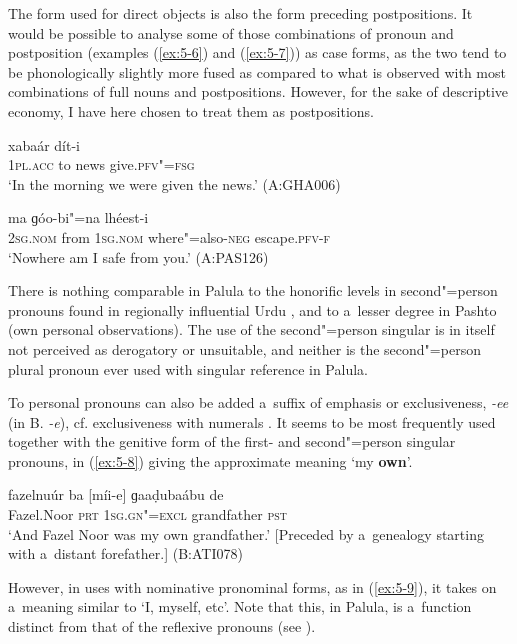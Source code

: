 The form used for direct objects is also the form preceding postpositions. It would be possible to analyse some of those combinations of pronoun and postposition (examples (\ref{ex:5-6}) and (\ref{ex:5-7})) as case forms, as the two tend to be phonologically slightly more fused as compared to what is observed with most combinations of full nouns and postpositions. However, for the sake of descriptive economy, I have here chosen to treat them as postpositions. 

\begin{exe}
\ex
\label{ex:5-6}
 xabaár dít-i \\
	1\textsc{pl}.\textsc{acc} to news give.\textsc{pfv"=fsg} \\
\glt `In the morning we were given the news.' (A:GHA006)

\ex
\label{ex:5-7}
\gll [tu díi] ma ɡóo-bi"=na lhéest-i \\
\textsc{2sg.nom} from \textsc{1sg.nom} where"=also-\textsc{neg} escape.\textsc{pfv-f} \\
\glt `Nowhere am I safe from you.' (A:PAS126)
\end{exe}

There is nothing comparable in Palula to the honorific levels in second"=person pronouns found in regionally influential Urdu \citep[17]{schmidt2004}, and to a~lesser degree in Pashto (own personal observations). The use of the second"=person singular is in itself not perceived as derogatory or unsuitable, and neither is the second"=person plural pronoun ever used with singular reference in Palula.

To personal pronouns can also be added a~suffix of emphasis or exclusiveness, \textit{-ee} (in B. \textit{-e}), cf. exclusiveness with numerals . It seems to be most frequently used together with the genitive form of the first- and second"=person singular pronouns, in (\ref{ex:5-8}) giving the approximate meaning `my \textbf{own}'.



\begin{exe}
\ex
\label{ex:5-8}
\gll fazelnuúr ba [míi-e] ɡaaḍubaábu de \\
	Fazel.Noor \textsc{prt} \textsc{1sg.gn"=excl} grandfather \textsc{pst} \\
\glt `And Fazel Noor was my own grandfather.' [Preceded by a~genealogy starting with a~distant forefather.] (B:ATI078)
\end{exe}

However, in uses with nominative pronominal forms, as in (\ref{ex:5-9}), it takes on a~meaning similar to `I, myself, etc'. Note that this, in Palula, is a~function distinct from that of the reflexive pronouns (see ).

